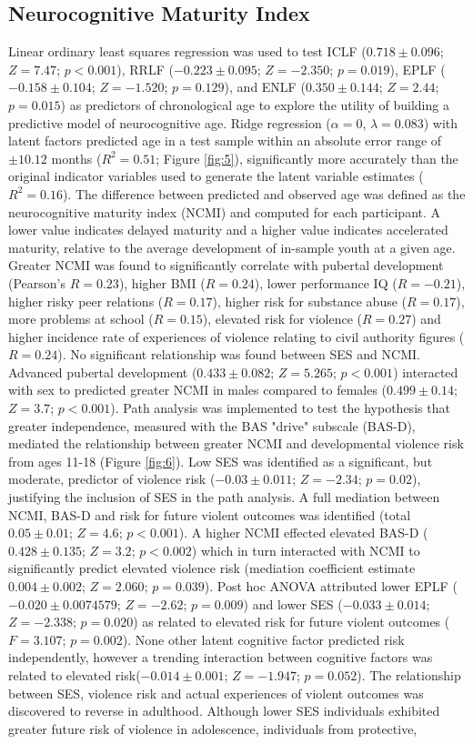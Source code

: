 \documentclass[utf8]{frontiersSCNS} %
\begin{document}
\subsection{Neurocognitive Maturity Index} Linear ordinary least squares regression was used to test ICLF ($0.718\pm0.096$; $Z=7.47$; $p<0.001$), RRLF ($-0.223\pm0.095$; $Z=-2.350$; $p = 0.019$), EPLF ($-0.158\pm0.104$; $Z=-1.520$; $p=0.129$), and ENLF ($0.350\pm0.144$; $Z=2.44$; $p=0.015$) as predictors of chronological age to explore the utility of building a predictive model of neurocognitive age. Ridge regression ($\alpha = 0$, $\lambda = 0.083$) with latent factors predicted age in a test sample within an absolute error range of $\pm 10.12$ months ($R^2=0.51$; Figure \ref{fig:5}), significantly more accurately than the original indicator variables used to generate the latent variable estimates ($R^2=0.16$). The difference between predicted and observed age was defined as the neurocognitive maturity index (NCMI) and computed for each participant. A lower value indicates delayed maturity and a higher value indicates accelerated maturity, relative to the average development of in-sample youth at a given age. Greater NCMI was found to significantly correlate with pubertal development (Pearson's $R=0.23$), higher BMI ($R=0.24$), lower performance IQ ($R=-0.21$), higher risky peer relations ($R=0.17$), higher risk for substance abuse ($R=0.17$), more problems at school ($R=0.15$), elevated risk for violence ($R=0.27$) and higher incidence rate of experiences of violence relating to civil authority figures ($R=0.24$). No significant relationship was found between SES and NCMI. Advanced pubertal development ($0.433\pm0.082$; $Z=5.265$; $p<0.001$) interacted with sex to predicted greater NCMI in males compared to females ($0.499\pm0.14$; $Z=3.7$; $p<0.001$). Path analysis was implemented to test the hypothesis that greater independence, measured with the BAS "drive" subscale (BAS-D), mediated the relationship between greater NCMI and developmental violence risk from ages 11-18 (Figure \ref{fig:6}). Low SES was identified as a significant, but moderate, predictor of violence risk ($-0.03\pm0.011$; $Z=-2.34$; $p=0.02$), justifying the inclusion of SES in the path analysis. A full mediation between NCMI, BAS-D and risk for future violent outcomes was identified (total $0.05\pm0.01$; $Z=4.6$; $p<0.001$). A higher NCMI effected elevated BAS-D ($0.428\pm0.135$; $Z=3.2$; $p<0.002$) which in turn interacted with NCMI to significantly predict elevated violence risk (mediation coefficient estimate $0.004\pm0.002$; $Z=2.060$; $p=0.039$). Post hoc ANOVA attributed lower EPLF ($-0.020\pm0.0074579$; $Z=-2.62$; $p=0.009$) and lower SES ($-0.033\pm0.014$;  $Z=-2.338$;  $p=0.020$) as related to elevated risk for future violent outcomes ($F=3.107$; $p=0.002$). None other latent cognitive factor predicted risk independently, however a trending interaction between cognitive factors was related to elevated risk($-0.014\pm0.001$; $Z=-1.947$;  $p=0.052$). The relationship between SES, violence risk and actual experiences of violent outcomes was discovered to reverse in adulthood. Although lower SES individuals exhibited greater future risk of violence in adolescence, individuals from protective, 
\end{document}
